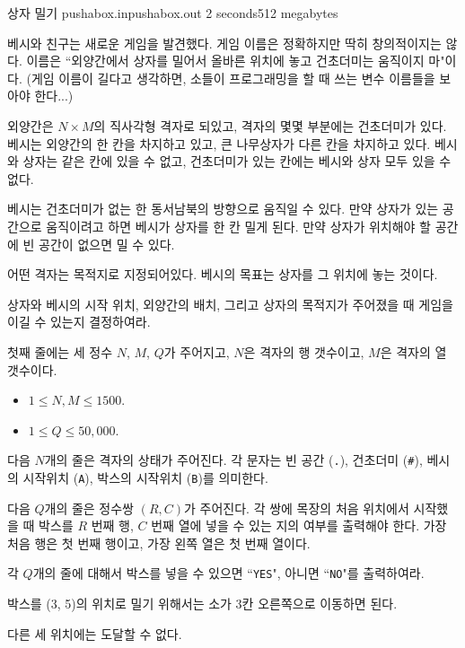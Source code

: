 \begin{problem}{상자 밀기}
	{pushabox.in}{pushabox.out}
	{2 seconds}{512 megabytes}{}
	
	베시와 친구는 새로운 게임을 발견했다. 게임 이름은 정확하지만 딱히 창의적이지는 않다. 이름은 ``외양간에서 상자를 밀어서 올바른 위치에 놓고 건초더미는 움직이지 마"이다. (게임 이름이 길다고 생각하면, 소들이 프로그래밍을 할 때 쓰는 변수 이름들을 보아야 한다...)
	
	외양간은 $N \times M$의 직사각형 격자로 되있고, 격자의 몇몇 부분에는 건초더미가 있다. 베시는 외양간의 한 칸을 차지하고 있고, 큰 나무상자가 다른 칸을 차지하고 있다. 베시와 상자는 같은 칸에 있을 수 없고, 건초더미가 있는 칸에는 베시와 상자 모두 있을 수 없다.
	
	베시는 건초더미가 없는 한 동서남북의 방향으로 움직일 수 있다. 만약 상자가 있는 공간으로 움직이려고 하면 베시가 상자를 한 칸 밀게 된다. 만약 상자가 위치해야 할 공간에 빈 공간이 없으면 밀 수 있다.
	
	어떤 격자는 목적지로 지정되어있다. 베시의 목표는 상자를 그 위치에 놓는 것이다.
	
	상자와 베시의 시작 위치, 외양간의 배치, 그리고 상자의 목적지가 주어졌을 때 게임을 이길 수 있는지 결정하여라.
	
	
	\InputFile
	
	첫째 줄에는 세 정수 $N$, $M$, $Q$가 주어지고, $N$은 격자의 행 갯수이고, $M$은 격자의 열 갯수이다.
	
	\begin{itemize}
		\item $1 \le N, M \le 1500$.
		\item $1 \le Q \le 50,000$.
	\end{itemize}
	
	다음 $N$개의 줄은 격자의 상태가 주어진다. 각 문자는 빈 공간 (\texttt{.}), 건초더미 (\texttt{\#}), 베시의 시작위치 (\texttt{A}), 박스의 시작위치 (\texttt{B})를 의미한다.
	
	다음 $Q$개의 줄은 정수쌍 $(R, C)$가 주어진다. 각 쌍에 목장의 처음 위치에서 시작했을 때 박스를 $R$ 번째 행, $C$ 번째 열에 넣을 수 있는 지의 여부를 출력해야 한다. 가장 처음 행은 첫 번째 행이고, 가장 왼쪽 열은 첫 번째 열이다.
	
	\OutputFile
	
	각 $Q$개의 줄에 대해서 박스를 넣을 수 있으면 ``\texttt{YES}", 아니면 ``\texttt{NO}"를 출력하여라.
	
	\Constraints
		
	\begin{example}
	\end{example}
	
	\Notes
	
	박스를 (3, 5)의 위치로 밀기 위해서는 소가 3칸 오른쪽으로 이동하면 된다.
	
	다른 세 위치에는 도달할 수 없다.
	
	
	
\end{problem}

